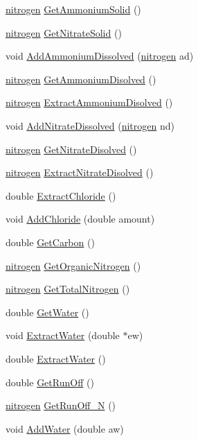 \begin{DoxyCompactItemize}
\item 
\hyperlink{classnitrogen}{nitrogen} \hyperlink{classsoil_surface_a4dac3a226167782d92048eab2e579abd}{GetAmmoniumSolid} ()
\item 
\hyperlink{classnitrogen}{nitrogen} \hyperlink{classsoil_surface_a11d7a697d6f5e5b101641bcd5801282d}{GetNitrateSolid} ()
\item 
void \hyperlink{classsoil_surface_aabff58a0f58d1f4ca7c0fccdc976fa77}{AddAmmoniumDissolved} (\hyperlink{classnitrogen}{nitrogen} ad)
\item 
\hyperlink{classnitrogen}{nitrogen} \hyperlink{classsoil_surface_a984469387e63e35357350cdfb35f294a}{GetAmmoniumDisolved} ()
\item 
\hyperlink{classnitrogen}{nitrogen} \hyperlink{classsoil_surface_a8142c8ab4d304c03b412bc1c28c8a40b}{ExtractAmmoniumDisolved} ()
\item 
void \hyperlink{classsoil_surface_a61a48f2de12c8e87039fdba220856439}{AddNitrateDissolved} (\hyperlink{classnitrogen}{nitrogen} nd)
\item 
\hyperlink{classnitrogen}{nitrogen} \hyperlink{classsoil_surface_a51dcb7eb6a1f8876beee1be1c85baa35}{GetNitrateDisolved} ()
\item 
\hyperlink{classnitrogen}{nitrogen} \hyperlink{classsoil_surface_aa7fb1af3a01553e72ed3437291195eaf}{ExtractNitrateDisolved} ()
\item 
double \hyperlink{classsoil_surface_a58ffb9a0d3adac6295a53b08bde3d243}{ExtractChloride} ()
\item 
void \hyperlink{classsoil_surface_a0a10fcbaeb2dbd98a6098e6a97b6095e}{AddChloride} (double amount)
\item 
double \hyperlink{classsoil_surface_a681cb140bad888b90a1c4e7fb9e390c7}{GetCarbon} ()
\item 
\hyperlink{classnitrogen}{nitrogen} \hyperlink{classsoil_surface_a3ca5e5b204e106714b33fa6993f02af8}{GetOrganicNitrogen} ()
\item 
\hyperlink{classnitrogen}{nitrogen} \hyperlink{classsoil_surface_a5d93b4b66e26d8e638f67c297db44821}{GetTotalNitrogen} ()
\item 
double \hyperlink{classsoil_surface_a2b80b68cebbbefb18ff4a1cbd54bbb6c}{GetWater} ()
\item 
void \hyperlink{classsoil_surface_a3291ec8531a504e9b274588d3ccec28f}{ExtractWater} (double $\ast$ew)
\item 
double \hyperlink{classsoil_surface_a68d7c37ad7e711584848df35d7583910}{ExtractWater} ()
\item 
double \hyperlink{classsoil_surface_aa5fbf9e9f54d0dc0cd138033038213a5}{GetRunOff} ()
\item 
\hyperlink{classnitrogen}{nitrogen} \hyperlink{classsoil_surface_ad8cea52b7a9dc89b8a3999a6d79785ed}{GetRunOff\_\-N} ()
\item 
void \hyperlink{classsoil_surface_a5d6f8c4c397d6cf8269ddd588e3e37f8}{AddWater} (double aw)
\end{DoxyCompactItemize}
